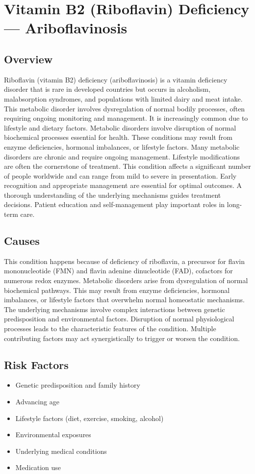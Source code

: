 \chapter{Vitamin B2 (Riboflavin) Deficiency --- Ariboflavinosis}
\label{sec:Vitamin B2 Deficiency}

\section{Overview}
Riboflavin (vitamin B2) deficiency (ariboflavinosis) is a vitamin deficiency disorder that is rare in developed countries but occurs in alcoholism, malabsorption syndromes, and populations with limited dairy and meat intake. This metabolic disorder involves dysregulation of normal bodily processes, often requiring ongoing monitoring and management. It is increasingly common due to lifestyle and dietary factors. Metabolic disorders involve disruption of normal biochemical processes essential for health. These conditions may result from enzyme deficiencies, hormonal imbalances, or lifestyle factors. Many metabolic disorders are chronic and require ongoing management. Lifestyle modifications are often the cornerstone of treatment. This condition affects a significant number of people worldwide and can range from mild to severe in presentation. Early recognition and appropriate management are essential for optimal outcomes. A thorough understanding of the underlying mechanisms guides treatment decisions. Patient education and self-management play important roles in long-term care.
\section{Causes}
This condition happens because of deficiency of riboflavin, a precursor for flavin mononucleotide (FMN) and flavin adenine dinucleotide (FAD), cofactors for numerous redox enzymes. Metabolic disorders arise from dysregulation of normal biochemical pathways. This may result from enzyme deficiencies, hormonal imbalances, or lifestyle factors that overwhelm normal homeostatic mechanisms. The underlying mechanisms involve complex interactions between genetic predisposition and environmental factors. Disruption of normal physiological processes leads to the characteristic features of the condition. Multiple contributing factors may act synergistically to trigger or worsen the condition.
\section{Risk Factors}
\begin{itemize}[noitemsep]
  \item Genetic predisposition and family history
  \item Advancing age
  \item Lifestyle factors (diet, exercise, smoking, alcohol)
  \item Environmental exposures
  \item Underlying medical conditions
  \item Medication use
\end{itemize}
